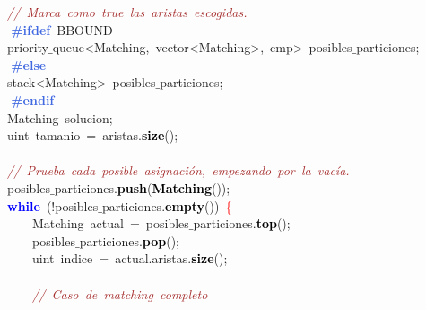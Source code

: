 \mbox{}\ \ \ \ \textit{\textcolor{Brown}{//\ Marca\ como\ true\ las\ aristas\ escogidas.}} \\
\mbox{}\textbf{\textcolor{RoyalBlue}{\ \ \ \ \#ifdef}}\ BBOUND \\
\mbox{}\ \ \ \ \textcolor{TealBlue}{priority$\_$queue\textless{}Matching,\ vector\textless{}Matching\textgreater{},\ cmp\textgreater{}}\ posibles$\_$particiones\textcolor{BrickRed}{;} \\
\mbox{}\textbf{\textcolor{RoyalBlue}{\ \ \ \ \#else}} \\
\mbox{}\ \ \ \ \textcolor{TealBlue}{stack\textless{}Matching\textgreater{}}\ posibles$\_$particiones\textcolor{BrickRed}{;} \\
\mbox{}\textbf{\textcolor{RoyalBlue}{\ \ \ \ \#endif}} \\
\mbox{}\ \ \ \ \textcolor{TealBlue}{Matching}\ solucion\textcolor{BrickRed}{;} \\
\mbox{}\ \ \ \ \textcolor{TealBlue}{uint}\ tamanio\ \textcolor{BrickRed}{=}\ aristas\textcolor{BrickRed}{.}\textbf{\textcolor{Black}{size}}\textcolor{BrickRed}{();} \\
\mbox{} \\
\mbox{}\ \ \ \ \textit{\textcolor{Brown}{//\ Prueba\ cada\ posible\ asignación,\ empezando\ por\ la\ vacía.}} \\
\mbox{}\ \ \ \ posibles$\_$particiones\textcolor{BrickRed}{.}\textbf{\textcolor{Black}{push}}\textcolor{BrickRed}{(}\textbf{\textcolor{Black}{Matching}}\textcolor{BrickRed}{());} \\
\mbox{}\ \ \ \ \textbf{\textcolor{Blue}{while}}\ \textcolor{BrickRed}{(!}posibles$\_$particiones\textcolor{BrickRed}{.}\textbf{\textcolor{Black}{empty}}\textcolor{BrickRed}{())}\ \textcolor{Red}{\{} \\
\mbox{}\ \ \ \ \ \ \ \ \textcolor{TealBlue}{Matching}\ actual\ \textcolor{BrickRed}{=}\ posibles$\_$particiones\textcolor{BrickRed}{.}\textbf{\textcolor{Black}{top}}\textcolor{BrickRed}{();} \\
\mbox{}\ \ \ \ \ \ \ \ posibles$\_$particiones\textcolor{BrickRed}{.}\textbf{\textcolor{Black}{pop}}\textcolor{BrickRed}{();} \\
\mbox{}\ \ \ \ \ \ \ \ \textcolor{TealBlue}{uint}\ indice\ \textcolor{BrickRed}{=}\ actual\textcolor{BrickRed}{.}aristas\textcolor{BrickRed}{.}\textbf{\textcolor{Black}{size}}\textcolor{BrickRed}{();} \\
\mbox{} \\
\mbox{}\ \ \ \ \ \ \ \ \textit{\textcolor{Brown}{//\ Caso\ de\ matching\ completo}} \\
